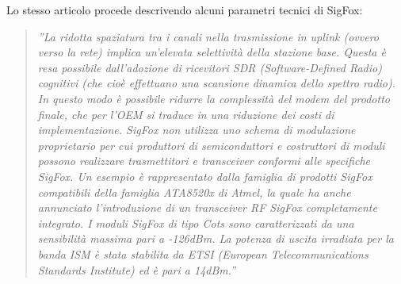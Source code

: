 \documentclass[a4paper]{report} %
\begin{document}
Lo stesso articolo procede descrivendo alcuni parametri tecnici di SigFox:
\begin{quote}
	\textit{''La ridotta spaziatura tra i canali nella trasmissione in uplink (ovvero verso la rete) implica un'elevata selettività della stazione base. Questa è resa possibile dall'adozione di ricevitori SDR (Software-Defined Radio) cognitivi (che cioè effettuano una scansione dinamica dello spettro radio). In questo modo è possibile ridurre la complessità del modem del prodotto finale, che per l'OEM si traduce in una riduzione dei costi di implementazione. SigFox non utilizza uno schema di modulazione proprietario per cui produttori di semiconduttori e costruttori di moduli possono realizzare trasmettitori e transceiver conformi alle specifiche SigFox. Un esempio è rappresentato dalla famiglia di prodotti SigFox compatibili della famiglia ATA8520x di Atmel, la quale ha anche annunciato l'introduzione di un transceiver RF SigFox completamente integrato. I moduli SigFox di tipo Cots sono caratterizzati da una sensibilità massima pari a -126dBm. La potenza di uscita irradiata per la banda ISM è stata stabilita da ETSI (European Telecommunications Standards Institute) ed è pari a 14dBm.''}
\end{quote}
\end{document}
